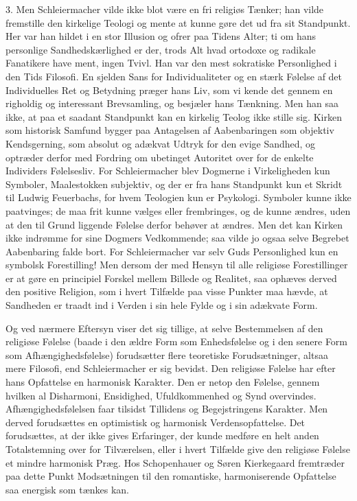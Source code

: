 \documentclass[12pt,a4paper,openany]{book}
\newcommand{\opage}[1]{\marginnote{\footnotesize\textit{[#1]}}}
\begin{document}
3. Men Schleiermacher vilde ikke blot være en fri
religiøs Tænker; han vilde fremstille den kirkelige
Teologi og mente at kunne gøre det ud fra sit Standpunkt.
Her var han hildet i en stor Illusion og ofrer
paa Tidens Alter; ti om hans personlige Sandhedskærlighed
er der, trods Alt hvad ortodoxe og radikale Fanatikere
have ment, ingen Tvivl. Han var den mest sokratiske
Personlighed i den Tids Filosofi. En sjelden Sans
for Individualiteter og en stærk Følelse af det Individuelles
Ret og Betydning præger hans Liv, som vi kende
det gennem en righoldig og interessant Brevsamling, og
besjæler hans Tænkning. Men han saa ikke, at paa et
saadant Standpunkt kan en kirkelig Teolog ikke stille
sig. Kirken som historisk Samfund bygger paa Antagelsen
af Aabenbaringen som objektiv Kendsgerning, som
absolut og adækvat Udtryk for den evige Sandhed, og
optræder derfor med Fordring om ubetinget Autoritet
over for de enkelte Individers Følelsesliv. For Schleiermacher
blev Dogmerne i Virkeligheden kun Symboler,
Maalestokken subjektiv, og der er fra hans Standpunkt
kun et Skridt til Ludwig Feuerbachs, for hvem Teologien
kun er Psykologi. Symboler kunne ikke paatvinges; de
maa frit kunne vælges eller frembringes, og de kunne
ændres, uden at den til Grund liggende Følelse derfor
\opage{9}behøver at ændres. Men det kan Kirken ikke indrømme
for sine Dogmers Vedkommende; saa vilde jo ogsaa
selve Begrebet Aabenbaring falde bort. For Schleiermacher
var selv Guds Personlighed kun en symbolsk
Forestilling! Men dersom der med Hensyn til alle
religiøse Forestillinger er at gøre en principiel Forskel
mellem Billede og Realitet, saa ophæves derved den positive
Religion, som i hvert Tilfælde paa visse Punkter
maa hævde, at Sandheden er traadt ind i Verden i sin
hele Fylde og i sin adækvate Form.

Og ved nærmere Eftersyn viser det sig tillige, at
selve Bestemmelsen af den religiøse Følelse (baade i den
ældre Form som Enhedsfølelse og i den senere Form som
Afhængighedsfølelse) forudsætter flere teoretiske Forudsætninger,
altsaa mere Filosofi, end Schleiermacher er sig
bevidst. Den religiøse Følelse har efter hans Opfattelse
en harmonisk Karakter. Den er netop den Følelse, gennem
hvilken al Disharmoni, Ensidighed, Ufuldkommenhed
og Synd overvindes. Afhængighedsfølelsen faar tilsidst
Tillidens og Begejstringens Karakter. Men derved forudsættes
en optimistisk og harmonisk Verdensopfattelse.
Det forudsættes, at der ikke gives Erfaringer, der kunde
medføre en helt anden Totalstemning over for Tilværelsen,
eller i hvert Tilfælde give den religiøse Følelse et mindre
harmonisk Præg. Hos Schopenhauer og Søren Kierkegaard
fremtræder paa dette Punkt Modsætningen til den
romantiske, harmoniserende Opfattelse saa energisk som
tænkes kan.
\end{document}
